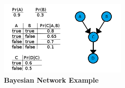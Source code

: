 \documentclass[conference]{IEEEtran}
\begin{document}


\begin{figure}[t]
	\centering
	\includegraphics[height=1.5in, width=2.5in]{BayesianNetwork.png}
	\caption{\bf Bayesian Network Example}
	\label{Fig:BayesianNet}
\end{figure}
\vspace{-0.3in}

\end{document}
